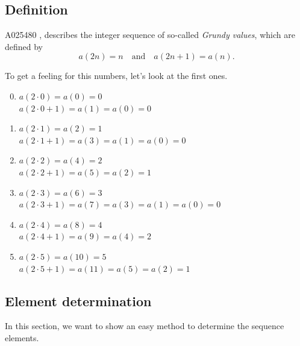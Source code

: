 \documentclass[12pt]{../document-templates/papers/one-column-mydashie/mydashie}
\newtheorem*{theorem A}{Theorem A}
\newtheorem*{theorem B}{N\"olker's Theorem}
\theoremstyle{remark}
\theoremstyle{remark}
\begin{document}
\subsection{Definition}
\label{ss:definition}
A025480 \cite{GrundyValues}, describes the integer sequence of so-called \textit{Grundy values}, which are defined by
\begin{equation}
    a\left(2n\right) = n \quad \mathrm{and} \quad a\left(2n+1\right) = a\left(n\right).
\label{eq:grundyvalues}
\end{equation}

To get a feeling for this numbers, let's look at the first ones.
\begin{enumerate}
    \setcounter{enumi}{-1}
    \item
        $a\left(2\cdot 0\right) = a\left(0\right) = 0$\\
        $a\left(2\cdot 0 + 1\right) = a\left(1\right) = a\left(0\right) = 0$
    \item
        $a\left(2\cdot 1\right) = a\left(2\right) = 1$\\
        $a\left(2\cdot 1 + 1\right) = a\left(3\right) = a\left(1\right) = a\left(0\right) = 0$
    \item
        $a\left(2\cdot 2\right) = a\left(4\right) = 2$\\
        $a\left(2\cdot 2 + 1\right) = a\left(5\right) = a\left(2\right) = 1$
    \item
        $a\left(2\cdot 3\right) = a\left(6\right) = 3$\\
        $a\left(2\cdot 3 + 1\right) = a\left(7\right) = a\left(3\right) = a\left(1\right) = a\left(0\right) = 0$
    \item
        $a\left(2\cdot 4\right) = a\left(8\right) = 4$\\
        $a\left(2\cdot 4 + 1\right) = a\left(9\right) = a\left(4\right) = 2$
    \item
        $a\left(2\cdot 5\right) = a\left(10\right) = 5$\\
        $a\left(2\cdot 5 + 1\right) = a\left(11\right) = a\left(5\right) = a\left(2\right) = 1$      
\end{enumerate}
\subsection{Element determination}
\label{ss:elementdetermination}
In this section, we want to show an easy method to determine the sequence elements.\\
\end{document}
